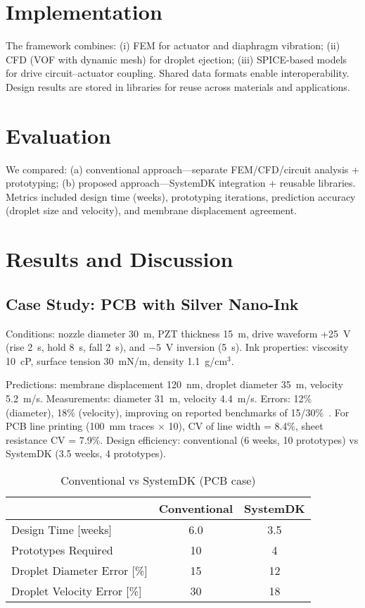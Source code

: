 \documentclass[conference]{IEEEtran}
\begin{document}
\section{Implementation}
The framework combines: (i) FEM for actuator and diaphragm vibration; (ii) CFD (VOF with dynamic mesh) for droplet ejection; (iii) SPICE-based models for drive circuit--actuator coupling. Shared data formats enable interoperability. Design results are stored in libraries for reuse across materials and applications.

\section{Evaluation}
We compared: (a) conventional approach---separate FEM/CFD/circuit analysis + prototyping; (b) proposed approach---SystemDK integration + reusable libraries. Metrics included design time (weeks), prototyping iterations, prediction accuracy (droplet size and velocity), and membrane displacement agreement.

\section{Results and Discussion}
\subsection{Case Study: PCB with Silver Nano-Ink}
Conditions: nozzle diameter 30~\textmu m, PZT thickness 15~\textmu m, drive waveform +25~V (rise 2~\textmu s, hold 8~\textmu s, fall 2~\textmu s), and $-5$~V inversion (5~\textmu s). Ink properties: viscosity 10~cP, surface tension 30~mN/m, density 1.1~g/cm$^3$.

Predictions: membrane displacement 120~nm, droplet diameter 35~\textmu m, velocity 5.2~m/s. Measurements: diameter 31~\textmu m, velocity 4.4~m/s. Errors: 12\% (diameter), 18\% (velocity), improving on reported benchmarks of 15/30\%~\cite{boccio2003,lei2012}. For PCB line printing (100~mm traces $\times$ 10), CV of line width = 8.4\%, sheet resistance CV = 7.9\%. Design efficiency: conventional (6 weeks, 10 prototypes) vs SystemDK (3.5 weeks, 4 prototypes).

\begin{table}[t]
\centering
\caption{Conventional vs SystemDK (PCB case)}
\begin{tabular}{lcc}
\toprule
 & Conventional & SystemDK \\
\midrule
Design Time [weeks] & 6.0 & 3.5 \\
Prototypes Required & 10  & 4   \\
Droplet Diameter Error [\%] & 15 & 12 \\
Droplet Velocity Error [\%] & 30 & 18 \\
\bottomrule
\end{tabular}
\label{tab:comparison}
\end{table}
\end{document}
